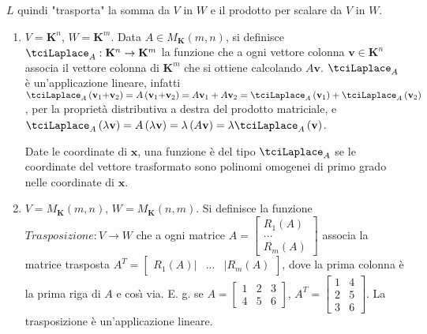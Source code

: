 \documentclass{article}
\begin{document}
$L$ quindi "trasporta" la somma da $V$ in $W$ e il prodotto per scalare da $%
V $ in $W$.

\begin{enumerate}
\item $V=\mathbf{K}^{n}$, $W=\mathbf{K}^{m}$. Data $A\in M_{\mathbf{K}%
}\left( m,n\right) $, si definisce $\tciLaplace _{A}:\mathbf{K}%
^{n}\rightarrow \mathbf{K}^{m}$ la funzione che a ogni vettore colonna $%
\mathbf{v}\in \mathbf{K}^{n}$ associa il vettore colonna di $\mathbf{K}^{m}$
che si ottiene calcolando $A\mathbf{v}$. $\tciLaplace _{A}$ \`{e}
un'applicazione lineare, infatti $\tciLaplace _{A}\left( \mathbf{v}_{1}%
\mathbf{+v}_{2}\right) =A\left( \mathbf{v}_{1}\mathbf{+v}_{2}\right) =A%
\mathbf{v}_{1}+A\mathbf{v}_{2}=\tciLaplace _{A}\left( \mathbf{v}_{1}\right)
+\tciLaplace _{A}\left( \mathbf{v}_{2}\right) $, per la propriet\`{a}
distributiva a destra del prodotto matriciale, e $\tciLaplace _{A}\left(
\lambda \mathbf{v}\right) =A\left( \lambda \mathbf{v}\right) =\lambda \left(
A\mathbf{v}\right) =\lambda \tciLaplace _{A}\left( \mathbf{v}\right) $.

Date le coordinate di $\mathbf{x}$, una funzione \`{e} del tipo $\tciLaplace
_{A}$ se le coordinate del vettore trasformato sono polinomi omogenei di
primo grado nelle coordinate di $\mathbf{x}$.

\item $V=M_{\mathbf{K}}\left( m,n\right) $, $W=M_{\mathbf{K}}\left(
n,m\right) $. Si definisce la funzione $Trasposizione:V\rightarrow W$ che a
ogni matrice $A=\left[ 
\begin{array}{c}
R_{1}\left( A\right) \\ 
... \\ 
R_{m}\left( A\right)%
\end{array}%
\right] $ associa la matrice trasposta $A^{T}=\left[ 
\begin{array}{ccc}
R_{1}\left( A\right) | & ... & |R_{m}\left( A\right)%
\end{array}%
\right] $, dove la prima colonna \`{e} la prima riga di $A$ e cos\`{\i} via.
E. g. se $A=\left[ 
\begin{array}{ccc}
1 & 2 & 3 \\ 
4 & 5 & 6%
\end{array}%
\right] $, $A^{T}=\left[ 
\begin{array}{cc}
1 & 4 \\ 
2 & 5 \\ 
3 & 6%
\end{array}%
\right] $. La trasposizione \`{e} un'applicazione lineare.
\end{enumerate}
\end{document}

